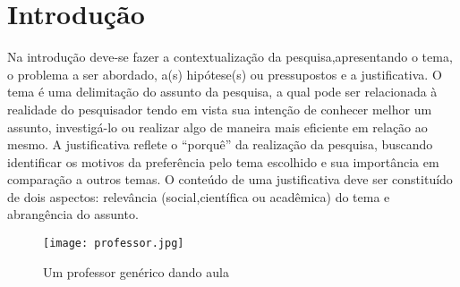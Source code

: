 \chapter[Introdução]{Introdução}
Na introdução deve-se fazer a contextualização da pesquisa,apresentando o tema, o problema a ser abordado, a(s) hipótese(s) ou pressupostos e a justificativa. O tema é uma delimitação do assunto da pesquisa, a qual pode ser relacionada à realidade do pesquisador tendo em vista sua intenção de conhecer melhor um assunto, investigá-lo ou realizar algo de maneira mais eficiente em relação ao mesmo. A justificativa reflete o “porquê” da realização da pesquisa, buscando identificar os motivos da preferência pelo tema escolhido e sua importância em comparação a outros temas. O conteúdo de uma justificativa deve ser constituído de dois aspectos: relevância (social,científica ou acadêmica) do tema e abrangência do assunto.
%
\begin{figure}[h]
    \centering
    \caption{Um professor genérico dando aula}
    \texttt{[image: professor.jpg]}
    \label{fig:my_label}
\end{figure}